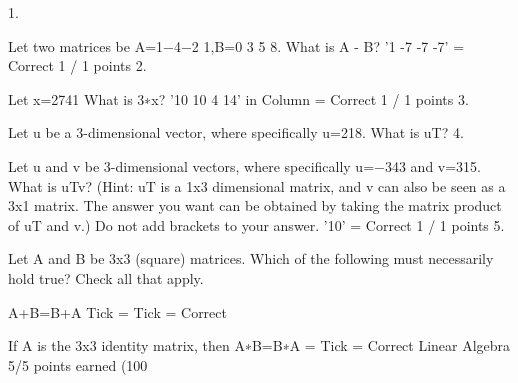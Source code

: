 1.

Let two matrices be A=1−4−2 1,B=0 3 5 8. What is A - B? '1 -7 -7 -7' = Correct 1 / 1 points
2. 

Let x=2741 What is 3∗x? '10 10 4 14' in Column = Correct 1 / 1 points
3. 

Let u be a 3-dimensional vector, where specifically u=218. What is uT? 
4. 

Let u and v be 3-dimensional vectors, where specifically u=−343 and v=315.
What is uTv? (Hint: uT is a 1x3 dimensional matrix, and v can also be seen as a 3x1 matrix. The answer you want can be obtained by taking the matrix product of uT and v.) Do not add brackets to your answer. '10' = Correct 1 / 1 points
5. 

Let A and B be 3x3 (square) matrices. Which of the following must necessarily hold true? Check all that apply.

A+B=B+A Tick = Tick = Correct 

If A is the 3x3 identity matrix, then A∗B=B∗A = Tick = Correct  
Linear Algebra
5/5 points earned (100%
